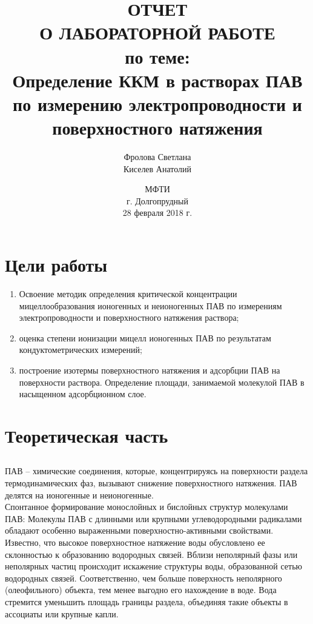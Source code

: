 \documentclass[a4paper,12pt]{article} %
\author{Фролова Светлана \\ Киселев Анатолий}
\title{ОТЧЕТ\\
О ЛАБОРАТОРНОЙ РАБОТЕ\\
по теме:\\
Определение ККМ в растворах ПАВ\\
по измерению электропроводности и\\
поверхностного натяжения
}
\date{МФТИ\\г. Долгопрудный\\[0.5cm]28 февраля 2018 г.}
\begin{document}
\maketitle

\newpage

\section{Цели работы}
\begin{enumerate}

\item Освоение методик определения критической концентрации мицеллообразования
ионогенных и неионогенных ПАВ по измерениям электропроводности и
поверхностного натяжения раствора;
\item оценка степени ионизации мицелл ионогенных ПАВ по результатам
кондуктометрических измерений;
\item построение изотермы поверхностного натяжения и адсорбции ПАВ на поверхности
раствора. Определение площади, занимаемой молекулой ПАВ в насыщенном
адсорбционном слое.
\end{enumerate}

\newpage

\section{Теоретическая часть}
\subsection*{}
ПАВ – химические соединения, которые, концентрируясь на поверхности раздела термодинамических фаз, вызывают снижение поверхностного натяжения. ПАВ делятся на ионогенные и неионогенные. \\
Спонтанное формирование монослойных и бислойных структур молекулами ПАВ: 
Молекулы ПАВ с длинными или крупными углеводородными радикалами обладают особенно выраженными поверхностно-активными свойствами. Известно, что высокое поверхностное натяжение воды обусловлено ее склонностью к образованию водородных связей. Вблизи неполярный фазы или неполярных частиц происходит искажение структуры воды, образованной сетью водородных связей. Соответственно, чем больше поверхность неполярного (олеофильного) объекта, тем менее выгодно его нахождение в воде. Вода стремится уменьшить площадь границы раздела, объединяя такие объекты в ассоциаты или крупные капли.
\end{document}
